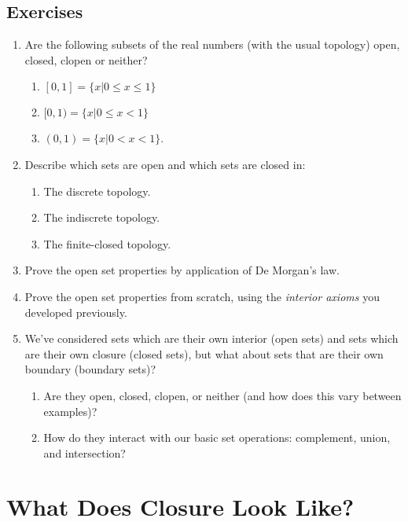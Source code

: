 \documentclass{report}
\begin{document}
\subsection*{Exercises}

\begin{enumerate}

\item Are the following subsets of the real numbers (with the usual topology) open, closed, clopen or neither?
\begin{enumerate}
\item $[0,1] = \{x | 0 ≤ x ≤ 1\}$
\item $[0,1) = \{x | 0 ≤ x < 1\}$
\item $(0,1) = \{x | 0 < x < 1\}$.
\end{enumerate}

\item Describe which sets are open and which sets are closed in:

\begin{enumerate}
\item The discrete topology.
\item The indiscrete topology.
\item The finite-closed topology.
\end{enumerate}

\item Prove the open set properties by application of De Morgan's law.

\item Prove the open set properties from scratch, using the \emph{interior axioms} you developed previously.

\item We've considered sets which are their own interior (open sets) and sets which are their own closure (closed sets), but what about sets that are their own boundary (boundary sets)? 
\begin{enumerate}
\item Are they open, closed, clopen, or neither (and how does this vary between examples)?
\item How do they interact with our basic set operations: complement, union, and intersection?
\end{enumerate}

\end{enumerate}

\section{What Does Closure Look Like?}
\end{document}
